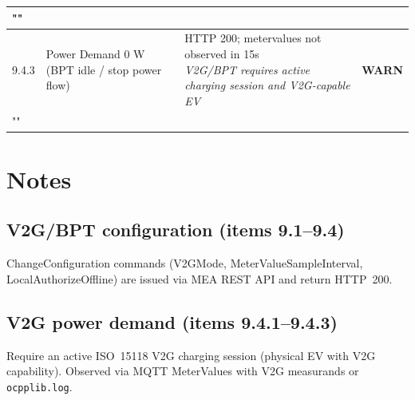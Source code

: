 \documentclass[10pt, a4paper]{article}
\begin{document}
\begin{longtable}{|L{1cm}|L{5.5cm}|M{7cm}|C{1.8cm}|}
\hline
{} \\
\hline
\small 9.4.3 & \small Power Demand 0 W (BPT idle / stop power flow) & HTTP 200; metervalues not observed in 15s{\newline\normalfont\footnotesize\itshape V2G/BPT requires active charging session and V2G-capable EV} & \textcolor{warnorange}{\textbf{WARN}} \\
\hline
{} \\
\hline
\end{longtable}
\normalsize

\section{Notes}

\subsection*{V2G/BPT configuration (items 9.1--9.4)}
ChangeConfiguration commands (V2GMode, MeterValueSampleInterval, LocalAuthorizeOffline)
are issued via MEA REST API and return HTTP~200.

\subsection*{V2G power demand (items 9.4.1--9.4.3)}
Require an active ISO~15118 V2G charging session (physical EV with V2G capability).
Observed via MQTT MeterValues with V2G measurands or \texttt{ocpplib.log}.
\end{document}
